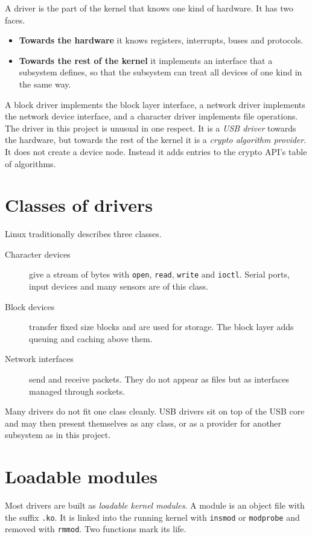 \documentclass[11pt,a4paper,oneside]{report}
\newcommand{\code}[1]{\texttt{\small #1}}
\begin{document}
A driver is the part of the kernel that knows one kind of hardware. It has two faces.

\begin{itemize}
  \item \textbf{Towards the hardware} it knows registers, interrupts, buses and protocols.
  \item \textbf{Towards the rest of the kernel} it implements an interface that a subsystem defines, so that the subsystem can treat all devices of one kind in the same way.
\end{itemize}

A block driver implements the block layer interface, a network driver implements the network device interface, and a character driver implements file operations. The driver in this project is unusual in one respect. It is a \emph{USB driver} towards the hardware, but towards the rest of the kernel it is a \emph{crypto algorithm provider}. It does not create a device node. Instead it adds entries to the crypto API's table of algorithms.

\section{Classes of drivers}

Linux traditionally describes three classes.

\begin{description}
  \item[Character devices] give a stream of bytes with \code{open}, \code{read}, \code{write} and \code{ioctl}. Serial ports, input devices and many sensors are of this class.
  \item[Block devices] transfer fixed size blocks and are used for storage. The block layer adds queuing and caching above them.
  \item[Network interfaces] send and receive packets. They do not appear as files but as interfaces managed through sockets.
\end{description}

Many drivers do not fit one class cleanly. USB drivers sit on top of the USB core and may then present themselves as any class, or as a provider for another subsystem as in this project.

\section{Loadable modules}

Most drivers are built as \emph{loadable kernel modules}. A module is an object file with the suffix \code{.ko}. It is linked into the running kernel with \code{insmod} or \code{modprobe} and removed with \code{rmmod}. Two functions mark its life.
\end{document}
